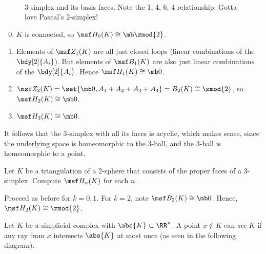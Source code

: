 \begin{solution}
\begin{figure}[H]
\begin{subfigure}{\linewidth}
    \end{subfigure}\\\vspace{0cm}
    \caption{3-simplex and its basis faces. Note the 1, 4, 6, 4 relationship.
      Gotta love Pascal's 2-simplex!}
    \label{fig:circumscribed}
  \end{figure}
  \begin{enumerate}[label=(\arabic*)]\setcounter{enumi}{-1}
  \item $K$ is connected, so $\msf H_0(K) \cong \mb \zmod{2}$.
  \item Elements of $\msf Z_1(K)$ are all just closed loops (linear combinations
    of the $\bdy[2]{A_i}$). But elements of $\msf B_1(K)$ are also just linear
    combinations of the $\bdy[2]{A_i}$. Hence $\msf H_1(K) \cong \mb 0$.
  \item $\msf Z_2(K) = \set{\mb 0, A_1 + A_2 + A_3 + A_4} = B_2(K) \cong
    \zmod{2}$, so $\msf H_2(K) \cong \mb 0$.
  \item $\msf H_3(K) \cong \mb 0$.
  \end{enumerate}
  It follows that the 3-simplex with all its faces is acyclic, which makes
  sense, since the underlying space is homeomorphic to the 3-ball, and the
  3-ball is homeomorphic to a point.
\end{solution}
\begin{problem}[16.10]
  Let $K$ be a triangulation of a 2-sphere that consists of the proper faces of
  a 3-simplex. Compute $\msf H_n(K)$ for each $n$.
\end{problem}
\begin{solution}
  Proceed as before for $k=0,1$. For $k=2$, note $\msf B_2(K) \cong \mb 0$.
  Hence, $\msf H_2(K) \cong \zmod{2}$.
\end{solution}
\begin{definition}
  Let $K$ be a simplicial complex with $\abs{K} \subset \RR^n$. A point $x
  \not\in K$ can \emph{see} $K$ if any ray from $x$ intersects $\abs{K}$ at most
  once (as seen in the following diagram).
\end{definition}
